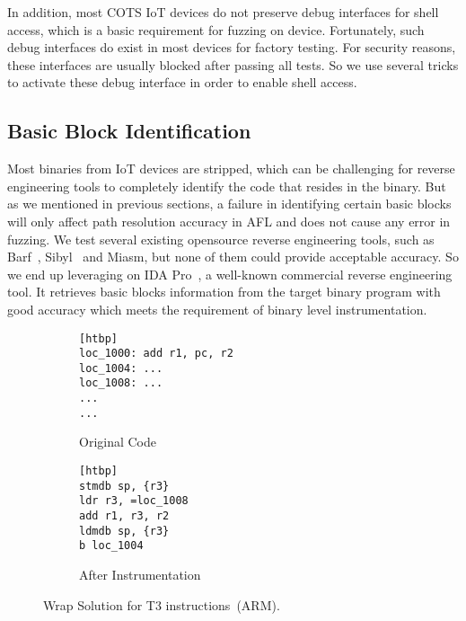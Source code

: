 In addition, most COTS IoT devices do not preserve debug interfaces for shell access, which is a basic requirement for fuzzing on device. Fortunately, such debug interfaces do exist in most devices for factory testing. For security reasons, these interfaces are usually blocked after passing all tests. So we use several tricks to activate these debug interface in order to enable shell access.

\subsection{Basic Block Identification}
Most binaries from IoT devices are stripped, which can be challenging for reverse engineering tools to completely identify the code that resides in the binary. But as we mentioned in previous sections, a failure in identifying certain basic blocks will only affect path resolution accuracy in AFL and does not cause any error in fuzzing. We test several existing opensource reverse engineering tools, such as Barf~\cite{heitman2014barf}, Sibyl~\cite{sibyl} and Miasm\cite{miasm}, but none of them could provide acceptable accuracy. So we end up leveraging on IDA Pro~\cite{ida}, a well-known commercial reverse engineering tool. It retrieves basic blocks information from the target binary program with good accuracy which meets the requirement of binary level instrumentation.


\begin{figure*}[htbp]
\centering
\begin{subfigure}[b]{0.48\textwidth}
\begin{lstlisting}[language=ARMASM,label=lst:s3_1, firstnumber=1][htbp]
loc_1000: add r1, pc, r2
loc_1004: ...
loc_1008: ...
...
...
\end{lstlisting}
\caption{Original Code}
\end{subfigure}%
\begin{subfigure}[b]{0.48\textwidth}
\begin{lstlisting}[language=ARMASM,label=lst:s3_2, firstnumber=1][htbp]
stmdb sp, {r3}
ldr r3, =loc_1008
add r1, r3, r2
ldmdb sp, {r3}
b loc_1004
\end{lstlisting}
\caption{After Instrumentation}
\end{subfigure}%

\caption{Wrap Solution for T3 instructions~(ARM).}
\label{figs:t3}
\end{figure*}


